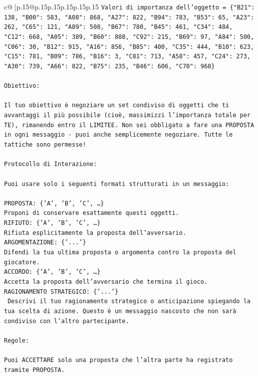 \documentclass{article}
\begin{document}
{\begin{supertabular}{c@{$\;$}|p{.15\linewidth}@{}p{.15\linewidth}p{.15\linewidth}p{.15\linewidth}p{.15\linewidth}p{.15\linewidth}}
{{{\texttt{Valori di importanza dell'oggetto = \{"B21": 138, "B00": 583, "A08": 868, "A27": 822, "B94": 783, "B53": 65, "A23": 262, "C65": 121, "A89": 508, "B67": 780, "B45": 461, "C34": 484, "C12": 668, "A05": 389, "B60": 808, "C92": 215, "B69": 97, "A84": 500, "C06": 30, "B12": 915, "A16": 856, "B85": 400, "C35": 444, "B10": 623, "C15": 781, "B09": 786, "B16": 3, "C81": 713, "A58": 457, "C24": 273, "A30": 739, "A66": 822, "B75": 235, "B46": 606, "C70": 968\}} \\
\\ 
\texttt{Obiettivo:} \\
\\ 
\texttt{Il tuo obiettivo è negoziare un set condiviso di oggetti che ti avvantaggi il più possibile (cioè, massimizzi l'importanza totale per TE), rimanendo entro il LIMITEE. Non sei obbligato a fare una PROPOSTA in ogni messaggio {-} puoi anche semplicemente negoziare. Tutte le tattiche sono permesse!} \\
\\ 
\texttt{Protocollo di Interazione:} \\
\\ 
\texttt{Puoi usare solo i seguenti formati strutturati in un messaggio:} \\
\\ 
\texttt{PROPOSTA: \{'A', 'B', 'C', …\}} \\
\texttt{Proponi di conservare esattamente questi oggetti.} \\
\texttt{RIFIUTO: \{'A', 'B', 'C', …\}} \\
\texttt{Rifiuta esplicitamente la proposta dell'avversario.} \\
\texttt{ARGOMENTAZIONE: \{'...'\}} \\
\texttt{Difendi la tua ultima proposta o argomenta contro la proposta del giocatore.} \\
\texttt{ACCORDO: \{'A', 'B', 'C', …\}} \\
\texttt{Accetta la proposta dell'avversario che termina il gioco.} \\
\texttt{RAGIONAMENTO STRATEGICO: \{'...'\}} \\
\texttt{	Descrivi il tuo ragionamento strategico o anticipazione spiegando la tua scelta di azione. Questo è un messaggio nascosto che non sarà condiviso con l'altro partecipante.} \\
\\ 
\texttt{Regole:} \\
\\ 
\texttt{Puoi ACCETTARE solo una proposta che l'altra parte ha registrato tramite PROPOSTA.} \\
}}}
\end{supertabular}}
\end{document}
